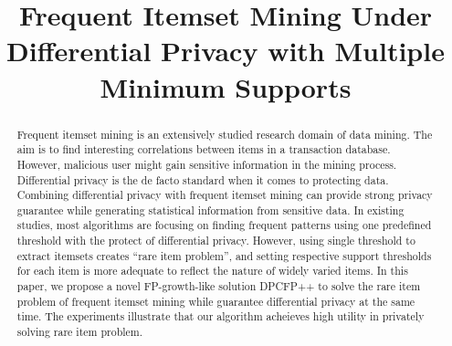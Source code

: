 \documentclass[conference]{IEEEtran}
\begin{document}
\newtheorem{definition}{Definition}
\theoremstyle{definition}
\newtheorem{example}{Example}
\theoremstyle{plain}
\newtheorem{theorem}{Theorem}

\newtheorem{lemma}{Lemma}


\title{Frequent Itemset Mining Under Differential Privacy with Multiple Minimum Supports}

\author{
\and
{}
\and
{}
}

\maketitle

\begin{abstract}%
Frequent itemset mining is an extensively studied research domain of data mining. The aim is to find interesting correlations between items in a transaction database. 
However, malicious user might gain sensitive information in the mining process. 
Differential privacy is the de facto standard when it comes to protecting data. 
Combining differential privacy with frequent itemset mining can provide strong privacy guarantee while generating statistical information from sensitive data.
In existing studies, most algorithms are focusing on finding frequent patterns using one predefined threshold with the protect of differential privacy.
However, using single threshold to extract itemsets creates ``rare item problem'', and setting respective support thresholds for each item is more adequate to reflect the nature of widely varied items.
In this paper, we propose a novel FP-growth-like solution DPCFP++ to solve the rare item problem of frequent itemset mining while guarantee differential privacy at the same time.
The experiments illustrate that our algorithm acheieves high utility in privately solving rare item problem.
\end{abstract}
\end{document}

